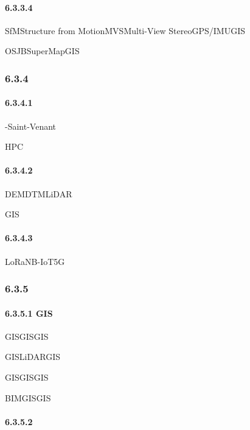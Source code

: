 \hypertarget{section-73}{%
\paragraph{6.3.3.4}\label{section-73}}

SfMStructure from MotionMVSMulti-View StereoGPS/IMUGIS

OSJBSuperMapGIS

\hypertarget{section-74}{%
\subsubsection{6.3.4}\label{section-74}}

\hypertarget{section-75}{%
\paragraph{6.3.4.1}\label{section-75}}

-Saint-Venant

HPC

\hypertarget{section-76}{%
\paragraph{6.3.4.2}\label{section-76}}

DEMDTMLiDAR

GIS

\hypertarget{section-77}{%
\paragraph{6.3.4.3}\label{section-77}}

LoRaNB-IoT5G

\hypertarget{section-78}{%
\subsubsection{6.3.5}\label{section-78}}

\hypertarget{gis-3}{%
\paragraph{6.3.5.1 GIS}\label{gis-3}}

GISGISGIS

GISLiDARGIS

GISGISGIS

BIMGISGIS

\hypertarget{section-79}{%
\paragraph{6.3.5.2}\label{section-79}}

